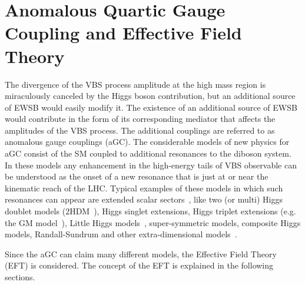 \section{Anomalous Quartic Gauge Coupling and Effective Field Theory}
The divergence of the VBS process amplitude at the high mass region is miraculously canceled by the Higgs boson contribution, but an additional source of EWSB would easily modify it. 
The existence of an additional source of EWSB would contribute in the form of its corresponding mediator that affects the amplitudes of the VBS process. 
The additional couplings are referred to as anomalous gauge couplings (aGC). 
The considerable models of new physics for aGC consist of the SM coupled to additional resonances to the diboson system.
In these models any enhancement in the high-energy tails of VBS observable can be understood as the onset of a new resonance that is just at or near the kinematic reach of the LHC.
Typical examples of these models in which such resonances can appear are extended scalar sectors~\cite{https://doi.org/10.48550/arxiv.2005.09889}, like two (or multi) Higgs doublet models (2HDM~\cite{BRANCO20121}), Higgs singlet extensions, Higgs triplet extensions (e.g. the GM model~\cite{PhysRevD.90.015007}), Little Higgs models~\cite{PhysRevD.71.015008}, super-symmetric models, composite Higgs models, Randall-Sundrum and other extra-dimensional models~\cite{cite-key}.

Since the aGC can claim many different models, the Effective Field Theory (EFT) is considered. 
The concept of the EFT is explained in the following sections.
